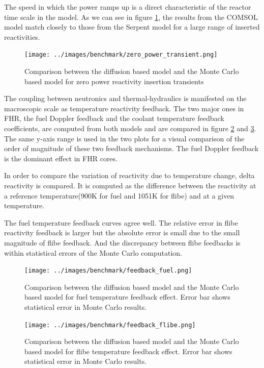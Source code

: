 \documentclass{elsarticle}
\begin{document}
The speed in which the power ramps up is a direct characteristic of the reactor time scale in the model. As we can see in figure \ref{fig:zero_power}, the results from the COMSOL model match closely to those from the Serpent model for a large range of inserted reactivities. 

\begin{figure}[ht]
  \centering
  \texttt{[image: ../images/benchmark/zero\_power\_transient.png]}
  \caption{Comparison between the diffusion based model and the Monte Carlo based model for zero power reactivity insertion transients}
  \label{fig:zero_power}
\end{figure}


The coupling between neutronics and thermal-hydraulics is manifested on the macroscopic scale as temperature reactivity feedback. The two major ones in FHR, the fuel Doppler feedback and the coolant temperature feedback coefficients, are computed from both models and are compared in figure \ref{fig:fuel_feedback} and \ref{fig:flibe_feedback}. The same y-axis range is used in the two plots for a visual comparison of the order of magnitude of these two feedback mechanisms. The fuel Doppler feedback is the dominant effect in FHR cores. 

In order to compare the variation of reactivity due to temperature change, delta reactivity is compared. It is computed as the difference between the reactivity at a reference temperature(900K for fuel and 1051K for flibe) and at a given temperature. 

The fuel temperature feedback curves agree well. 
The relative error in flibe reactivity feedback is larger but the absolute error is small due to the small magnitude of flibe feedback. And the discrepancy between flibe feedbacks is within statistical errors of the Monte Carlo computation. 


\begin{figure}[ht]
  \centering
  \texttt{[image: ../images/benchmark/feedback\_fuel.png]}
  \caption{Comparison between the diffusion based model and the Monte Carlo based model for fuel temperature feedback effect. Error bar shows statistical error in Monte Carlo results.} 
  \label{fig:fuel_feedback}
\end{figure}

\begin{figure}[ht]
  \centering
  \texttt{[image: ../images/benchmark/feedback\_flibe.png]}
  \caption{Comparison between the diffusion based model and the Monte Carlo based model for flibe temperature feedback effect. Error bar shows statistical error in Monte Carlo results.} 
  \label{fig:flibe_feedback}
\end{figure}
\end{document}

